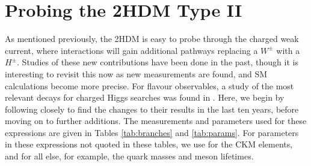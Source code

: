 \documentclass[a4paper,12pt]{article}
\begin{document}
\section{Probing the 2HDM Type II}
\label{sec:probe}
As mentioned previously, the 2HDM is easy to probe through the charged weak current, where interactions will gain additional pathways replacing a $W^{\pm}$ with a $H^{\pm}$. 
Studies of these new contributions have been done in the past, though it is interesting to revisit this now as new measurements are found, and SM calculations become more precise.
For flavour observables, a study of the most relevant decays for charged Higgs searches was found in \cite{desc}.
Here, we begin by following \cite{desc} closely to find the changes to their results in the last ten years, before moving on to further additions. 
The measurements and parameters used for these expressions are given in Tables \ref{tab:branches} and \ref{tab:params}.
For parameters in these expressions not quoted in these tables, we use \cite{ckm} for the CKM elements, and \cite{pdg} for all else, for example, the quark masses and meson lifetimes.
\end{document}
